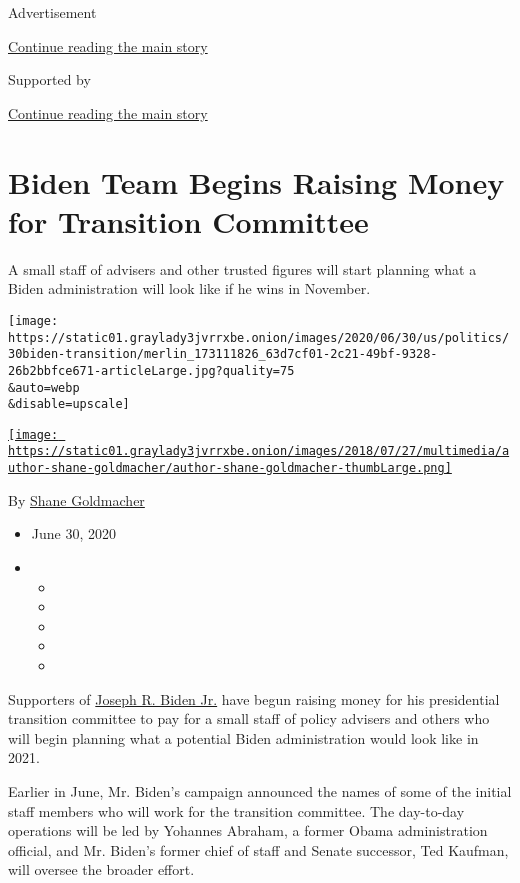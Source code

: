 Advertisement

\protect\hyperlink{after-top}{Continue reading the main story}

Supported by

\protect\hyperlink{after-sponsor}{Continue reading the main story}

\hypertarget{biden-team-begins-raising-money-for-transition-committee}{%
\section{Biden Team Begins Raising Money for Transition
Committee}\label{biden-team-begins-raising-money-for-transition-committee}}

A small staff of advisers and other trusted figures will start planning
what a Biden administration will look like if he wins in November.

\texttt{[image: https://static01.graylady3jvrrxbe.onion/images/2020/06/30/us/politics/30biden-transition/merlin\_173111826\_63d7cf01-2c21-49bf-9328-26b2bbfce671-articleLarge.jpg?quality=75\\\&auto=webp\\\&disable=upscale]}

\href{https://www.nytimes3xbfgragh.onion/by/shane-goldmacher}{\texttt{[image: https://static01.graylady3jvrrxbe.onion/images/2018/07/27/multimedia/author-shane-goldmacher/author-shane-goldmacher-thumbLarge.png]}}

By \href{https://www.nytimes3xbfgragh.onion/by/shane-goldmacher}{Shane
Goldmacher}

\begin{itemize}
\item
  June 30, 2020
\item
  \begin{itemize}
  \item
  \item
  \item
  \item
  \item
  \end{itemize}
\end{itemize}

Supporters of
\href{https://www.nytimes3xbfgragh.onion/interactive/2020/us/elections/joe-biden.html}{Joseph
R. Biden Jr.} have begun raising money for his presidential transition
committee to pay for a small staff of policy advisers and others who
will begin planning what a potential Biden administration would look
like in 2021.

Earlier in June, Mr. Biden's campaign announced the names of some of the
initial staff members who will work for the transition committee. The
day-to-day operations will be led by Yohannes Abraham, a former Obama
administration official, and Mr. Biden's former chief of staff and
Senate successor, Ted Kaufman, will oversee the broader effort.

